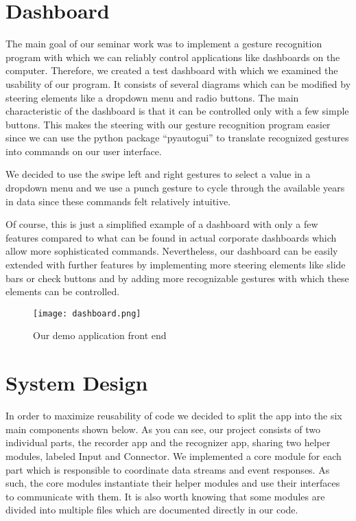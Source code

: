\chapter{Dashboard}
\label{ch:Dashboard}

The main goal of our seminar work was to implement a gesture recognition program with which we can reliably control applications like dashboards on the computer.
Therefore, we created a test dashboard with which we examined the usability of our program.
It consists of several diagrams which can be modified by steering elements like a dropdown menu and radio buttons.
The main characteristic of the dashboard is that it can be controlled only with a few simple buttons.
This makes the steering with our gesture recognition program easier since we can use the python package “pyautogui” to translate recognized gestures into commands on our user interface.

We decided to use the swipe left and right gestures to select a value in a dropdown menu and we use a punch gesture to cycle through the available years in data since these commands felt relatively intuitive. 

Of course, this is just a simplified example of a dashboard with only a few features compared to what can be found in actual corporate dashboards which allow more sophisticated commands.
Nevertheless, our dashboard can be easily extended with further features by implementing more steering elements like slide bars or check buttons and by adding more recognizable gestures with which these elements can be controlled.  

\begin{figure}[htp]
\begin{center}
  \texttt{[image: dashboard.png]}
\caption{Our demo application front end}
\end{center}
\end{figure} 


\chapter{System Design}
\label{ch:SystemDesign}

In order to maximize reusability of code we decided to split the app into the six main components shown below. As you can see, our project consists of two individual parts, the recorder app and the recognizer app, sharing two helper modules, labeled Input and Connector. We implemented a core module for each part which is responsible to coordinate data streams and event responses. As such, the core modules instantiate their helper modules and use their interfaces to communicate with them. It is also worth knowing that some modules are divided into multiple files which are documented directly in our code.

